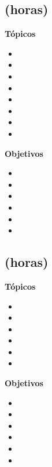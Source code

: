 \subsection{\NCDOSDef  (\NCDOSHours horas)}\label{sec:BOK-NC2}

\textbf{Tópicos}
\begin{itemize}
	\item \NCDOSTopicEstandares
	\item \NCDOSTopicEl
	\item \NCDOSTopicConmutacion
	\item \NCDOSTopicFlujos
	\item \NCDOSTopicConceptos
	\item \NCDOSTopicConceptosde
	\item \NCDOSTopicTrabajo
	\item \NCDOSTopicServicios
\end{itemize}

\textbf{Objetivos}
\begin{itemize}
	\item \NCDOSObjUNO
	\item \NCDOSObjDOS
	\item \NCDOSObjTRES
	\item \NCDOSObjCUATRO
	\item \NCDOSObjCINCO
	\item \NCDOSObjSEIS
\end{itemize}

\subsection{\NCTRESDef  (\NCTRESHours horas)}\label{sec:BOK-NC3}

\textbf{Tópicos}
\begin{itemize}
	\item \NCTRESTopicFundamentos
	\item \NCTRESTopicAlgoritmos
	\item \NCTRESTopicAlgoritmosde
	\item \NCTRESTopicAutenticacion
	\item \NCTRESTopicFirmas
	\item \NCTRESTopicEjemplos
\end{itemize}

\textbf{Objetivos}
\begin{itemize}
	\item \NCTRESObjUNO
	\item \NCTRESObjDOS
	\item \NCTRESObjTRES
	\item \NCTRESObjCUATRO
	\item \NCTRESObjCINCO
	\item \NCTRESObjSEIS
\end{itemize}

